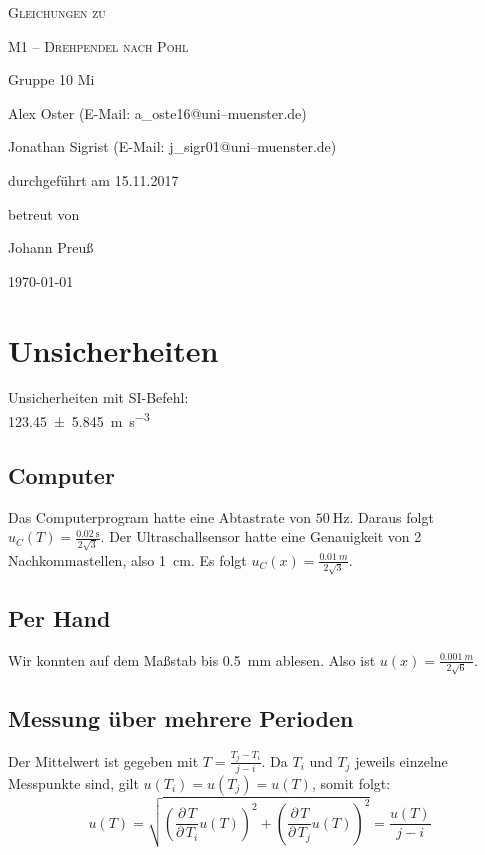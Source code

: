 \documentclass[11pt,a4paper,titlepage, ngerman]{article}
\begin{document}
	
	
	\begin{titlepage}
		
		\centering
		{\scshape\LARGE Gleichungen zu \par}
		\vspace{1cm}
		{\scshape\huge M1 -- Drehpendel nach Pohl\par}
		\vspace{2.5cm}
		{\LARGE Gruppe 10 Mi\par}
		\vspace{0.5cm}
		{\large Alex Oster (E-Mail: a\_oste16@uni--muenster.de) \par}
		{\large Jonathan Sigrist (E-Mail: j\_sigr01@uni--muenster.de) \par}
		\vfill
		durchgeführt am 15.11.2017\par
		betreut von\par
		{\large Johann Preuß}		
		\vfill	
		{\large \today\par}
		
	\end{titlepage}
		
	\tableofcontents
		
	\newpage
	
	\section{Unsicherheiten}
	Unsicherheiten mit SI-Befehl:\\
	 \SI{123.45 +- 5.845}{\meter\per\second\cubed}
	
	
	\subsection*{Computer}
	Das Computerprogram hatte eine Abtastrate von $\SI{50}{\hertz}$. Daraus folgt $u_C(T) = \frac{\SI{0,02}{\second}}{2\sqrt{3}}$.
	Der Ultraschallsensor hatte eine Genauigkeit von 2 Nachkommastellen, also \SI{1}{cm}. Es folgt $u_C(x) = \frac{\SI{0,01}{m}}{2\sqrt{3}}$.
	
	\subsection*{Per Hand}
	Wir konnten auf dem Maßstab bis \SI{0,5}{mm} ablesen. Also ist $u(x) = \frac{\SI{0,001}{m}}{2\sqrt{6}}$.
	
	\subsection{Messung über mehrere Perioden}
	Der Mittelwert ist gegeben mit $T = \frac{T_j - T_i}{j-i}$.
	Da $T_i$ und $T_j$ jeweils einzelne Messpunkte sind, gilt $u(T_i) = u(T_j) = u(T)$, somit folgt:
	\begin{equation}
		u(T) = \sqrt{\left( \frac{\partial\, T}{\partial\, T_i} u(T)\right)^2 + \left( \frac{\partial\, T}{\partial\, T_j} u(T)\right)^2}
		=\frac{u(T)}{j-i}
	\end{equation}
	
\end{document}
